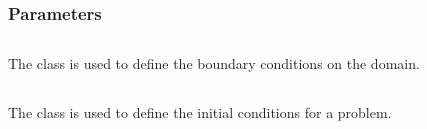 \subsubsection{Parameters}

\subsection{} \label{ss:component-boundary}

The  class is used to define the boundary conditions on
the domain.

\subsection{} \label{s:component-initial}

The  class is used to define the initial conditions for
a problem.



